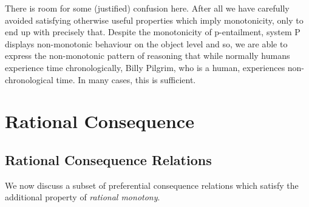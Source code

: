 There is room for some (justified) confusion here. After all we have carefully avoided satisfying otherwise useful
properties which imply monotonicity, only to end up with precisely that. Despite the monotonicity of p-entailment, system
P displays non-monotonic behaviour on the object level and so, we are able to express the non-monotonic pattern of
reasoning that while normally humans experience time chronologically, Billy Pilgrim, who is a human, experiences non-chronological
time. In many cases, this is sufficient.





\section{Rational Consequence}
\label{section:rational-consequence}

\subsection{Rational Consequence Relations}
\label{subsection:rational-consequence-relations}

We now discuss a subset of preferential consequence relations which satisfy the additional property of \textit{rational
monotony}.

